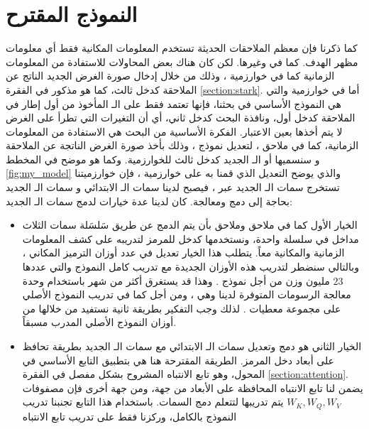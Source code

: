 \section{النموذج المقترح\label{section:my_model}}
كما ذكرنا فإن معظم الملاحقات الحديثة تستخدم المعلومات المكانية فقط أي  معلومات مظهر الهدف. كما في 
 وغيرها. 
لكن كان هناك بعض المحاولات للاستفادة من المعلومات الزمانية كما في  خوارزمية
،
وذلك من خلال إدخال صورة الغرض الجديد الناتج عن الملاحقة كدخل ثالث، كما هو مذكور في الفقرة 
\ref{section:stark}.
\newline
أما في خوارزمية
والتي هي النموذج الأساسي في بحثنا، فإنها تعتمد فقط على الـ
المأخوذ من أول إطار في الملاحقة كدخل أول، ونافذة البحث كدخل ثاني، أي أن التغيرات التي تطرأ على الغرض لا يتم أخذها بعين الاعتبار.
\newline
الفكرة الأساسية من البحث هي الاستفادة من المعلومات الزمانية، كما في ملاحق 
،
لتعديل نموذج
،
وذلك بأخذ صورة الغرض الناتجة عن الملاحقة
و سنسميها
أو الـ
الجديد
كدخل ثالث للخوارزمية.
\newline
وكما هو موضح في المخطط 
\ref{fig:my_model}
والذي يوضح التعديل الذي قمنا به على خوارزمية 
،
 فإن خوارزميتنا تستخرج سمات الـ
الجديد
عبر 
،
فيصبح لدينا سمات الـ
الابتدائي و سمات الـ
الجديد
بحاجة إلى دمج ومعالجة.
\newline 
كان لدينا عدة خيارات لدمج سمات الـ
الجديد:
\begin{itemize}
\item
الخيار الأول كما في ملاحق
وملاحق
بأن يتم الدمج عن طريق سَلسَلة
سمات الثلاث مداخل في سلسلة واحدة، ونستخدمها كدخل للمرمز لتدريبه على كشف المعلومات الزمانية والمكانية معاً.
\newline
يتطلب هذا الخيار تعديل في عدد أوزان الترميز المكاني 
، 
وبالتالي سنضطر لتدريب هذه الأوزان الجديدة مع تدريب كامل النموذج والتي عددها $23$ مليون وزن من أجل نموذج 
.
وهذا قد يستغرق أكثر من شهر باستخدام وحدة معالجة الرسومات 
المتوفرة لدينا وهي 
،
ومن أجل 
كما في تدريب النموذج الأصلي على مجموعة معطيات 
.
لذلك وجب التفكير بطريقة ثانية نستفيد من خلالها من أوزان النموذج الأصلي المدرب مسبقاً.
\item 
الخيار الثاني هو دمج وتعديل سمات الـ
الابتدائي مع سمات الـ
الجديد بطريقة تحافظ على أبعاد دخل المرمز.
\newline
الطريقة المقترحة هنا هي بتطبيق التابع الأساسي في المحول، وهو تابع الانتباه المشروح بشكل مفصل في الفقرة
\ref{section:attention}.
يضمن لنا تابع الانتباه المحافظة على الأبعاد من جهة، ومن جهة أخرى فإن مصفوفات 
$W_K,W_Q,W_V$
يتم تدريبها لتتعلم دمج السمات.
باستخدام هذا التابع تجنبنا تدريب النموذج بالكامل، وركزنا فقط على تدريب تابع الانتباه
\end{itemize}
